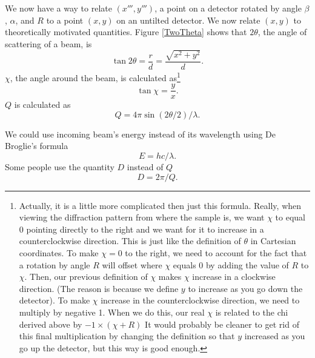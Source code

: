 We now have a way to relate $(x''',y''')$, 
a point on a detector rotated by angle $\beta$, 
$\alpha$, and $R$ to a point $(x,y)$
on an untilted detector.
We now relate $(x,y)$ to theoretically motivated 
quantities. Figure \ref{TwoTheta} shows that
$2\theta$, the angle of scattering 
of a beam, is 
\begin{equation}\label{2thetatermsr}
    \tan2\theta = \frac{r}{d} = \frac{\sqrt{x^2+y^2}}{d}.
\end{equation}
$\chi$, the angle around the beam, is calculated 
as\footnote{Actually, it is a little more complicated
then just this formula. Really, when viewing the diffraction
pattern from where the sample is, we want $\chi$ to equal 0 
pointing directly to the right and we want for it to 
increase in a 
counterclockwise direction. This is just like the 
definition of $\theta$ in Cartesian coordinates. 
To make $\chi=0$ to the right, we need to account for the 
fact that a rotation by angle $R$ will offset where $\chi$ 
equals 0 by adding the value of $R$ to $\chi$.
Then, our previous definition of $\chi$ makes $\chi$ 
increase in a
clockwise direction. (The reason is because we define $y$
to increase as you go down the detector). To make $\chi$ 
increase in the counterclockwise direction, we need to 
multiply by negative 1. When we do this, our real $\chi$ is 
related to the chi derived above by $-1\times(\chi+R)$
It would probably be cleaner to get rid of this final
multiplication by changing the definition so
that $y$ increased as you go up the detector, but this
way is good enough.}
\begin{equation}\label{chitermsyx}
    \tan\chi = \frac{y}{x}.
\end{equation}
$Q$ is calculated as
\begin{equation}\label{qterms2theta}
    Q = 4\pi \sin(2\theta/2)/\lambda.
\end{equation}

\begin{SCfigure}[1][bthp]
    \centering
    
    \caption{For a particular point $(x,y)$ on an 
    untilted detector, we define $2\theta$ as the angle of 
    scattering of the beam and $\chi$ as the
    azimuthal angle of the scattered light around 
    the beam.}
    \label{TwoTheta}
\end{SCfigure}

We could use incoming beam's energy instead of its wavelength 
using De Broglie's formula
\begin{equation}
    E = hc/\lambda.
\end{equation}
Some people use the quantity $D$ instead of $Q$
\begin{equation}\label{DtermsQ}
    D = 2\pi/Q.
\end{equation}

